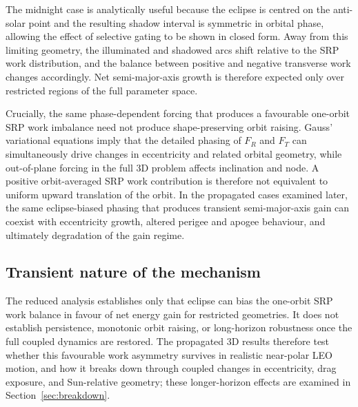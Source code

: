 \vspace{0.5em}
\par\noindent The midnight case is analytically useful because the eclipse is centred on the anti-solar point and the resulting shadow interval is symmetric in orbital phase, allowing the effect of selective gating to be shown in closed form. Away from this limiting geometry, the illuminated and shadowed arcs shift relative to the SRP work distribution, and the balance between positive and negative transverse work changes accordingly. Net semi-major-axis growth is therefore expected only over restricted regions of the full parameter space.

\vspace{0.5em}
\par\noindent Crucially, the same phase-dependent forcing that produces a favourable one-orbit SRP work imbalance need not produce shape-preserving orbit raising. Gauss' variational equations imply that the detailed phasing of \(F_R\) and \(F_T\) can simultaneously drive changes in eccentricity and related orbital geometry, while out-of-plane forcing in the full 3D problem affects inclination and node. A positive orbit-averaged SRP work contribution is therefore not equivalent to uniform upward translation of the orbit. In the propagated cases examined later, the same eclipse-biased phasing that produces transient semi-major-axis gain can coexist with eccentricity growth, altered perigee and apogee behaviour, and ultimately degradation of the gain regime.
\vspace{0.5em}


\subsection{Transient nature of the mechanism}
\noindent The reduced analysis establishes only that eclipse can bias the one-orbit SRP work balance in favour of net energy gain for restricted geometries. It does not establish persistence, monotonic orbit raising, or long-horizon robustness once the full coupled dynamics are restored. The propagated 3D results therefore test whether this favourable work asymmetry survives in realistic near-polar LEO motion, and how it breaks down through coupled changes in eccentricity, drag exposure, and Sun-relative geometry; these longer-horizon effects are examined in Section~\ref{sec:breakdown}.
\FloatBarrier